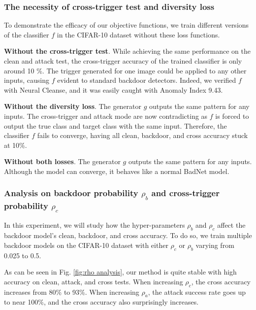 \documentclass{article}
\begin{document}
\subsubsection{The necessity of cross-trigger test and diversity loss}
To demonstrate the efficacy of our objective functions, we train different versions of the classifier $f$ in the CIFAR-10 dataset without these loss functions. 

\textbf{Without the cross-trigger test}. While achieving the same performance on the clean and attack test, the cross-trigger accuracy of the trained classifier is only around 10 \%. The trigger generated for one image could be applied to any other inputs, causing $f$ evident to standard backdoor detectors. Indeed, we verified $f$ with Neural Cleanse, and it was easily caught with Anomaly Index 9.43.
 
\textbf{Without the diversity loss}. The generator $g$ outputs the same pattern for any inputs. The cross-trigger and attack mode are now contradicting as $f$ is forced to output the true class and target class with the same input. Therefore, the classifier $f$ fails to converge, having all clean, backdoor, and cross accuracy stuck at 10\%.

\textbf{Without both losses}. 
The generator $g$ outputs the same pattern for any inputs. Although the model can converge, it behaves like a normal BadNet model.

\subsubsection{Analysis on backdoor probability $\rho_b$ and cross-trigger probability $\rho_c$}

In this experiment, we will study how the hyper-parameters $\rho_b$ and $\rho_c$ affect the backdoor model's clean, backdoor, and cross accuracy. To do so, we train multiple backdoor models on the CIFAR-10 dataset with either $\rho_c$  or $\rho_b$ varying from 0.025 to 0.5.

As can be seen in Fig. \ref{fig:rho analysis}, our method is quite stable with high accuracy on clean, attack, and cross tests. When increasing $\rho_c$, the cross accuracy increases from 80\% to 93\%. When increasing $\rho_a$, the attack success rate goes up to near 100\%, and the cross accuracy also surprisingly increases.
\end{document}
